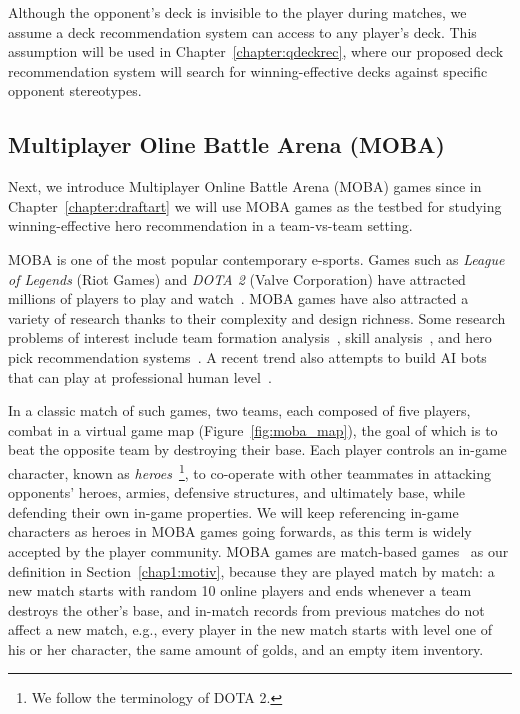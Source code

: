 Although the opponent's deck is invisible to the player during matches, we assume a deck recommendation system can access to any player's deck. This assumption will be used in Chapter~\ref{chapter:qdeckrec}, where our proposed deck recommendation system will search for winning-effective decks against specific opponent stereotypes. 


\subsection{Multiplayer Oline Battle Arena (MOBA)}\label{sec:background_moba}
Next, we introduce Multiplayer Online Battle Arena (MOBA) games since in Chapter~\ref{chapter:draftart} we will use MOBA games as the testbed for studying winning-effective hero recommendation in a team-vs-team setting.

MOBA is one of the most popular contemporary e-sports. Games such as \textit{League of Legends} (Riot Games) and \textit{DOTA 2} (Valve Corporation) have attracted millions of players to play and watch~\cite{lol_fanbase,lol_27million}. MOBA games have also attracted a variety of research thanks to their complexity and design richness. Some research problems of interest include team formation analysis~\cite{pobie1,pobie2,neidhardt2015team,kim2016proficiency}, skill analysis~\cite{zhengxing2016player,Drachen:skill}, and hero pick recommendation systems~\cite{summerville2017reco,hanke2017reco}. A recent trend also attempts to build AI bots that can play at professional human level~\cite{openaidota}. 

In a classic match of such games, two teams, each composed of five players, combat in a virtual game map (Figure~\ref{fig:moba_map}), the goal of which is to beat the opposite team by destroying their base. Each player controls an in-game character, known as \textit{heroes}~\footnote{We follow the terminology of DOTA 2.}, to co-operate with other teammates in attacking opponents' heroes, armies, defensive structures, and ultimately base, while defending their own in-game properties. We will keep referencing in-game characters as heroes in MOBA games going forwards, as this term is widely accepted by the player community. MOBA games are match-based games~\cite{guo2012analysis} as our definition in Section~\ref{chap1:motiv}, because they are played match by match: a new match starts with random 10 online players and ends whenever a team destroys the other's base, and in-match records from previous matches do not affect a new match, e.g., every player in the new match starts with level one of his or her character, the same amount of golds, and an empty item inventory.


